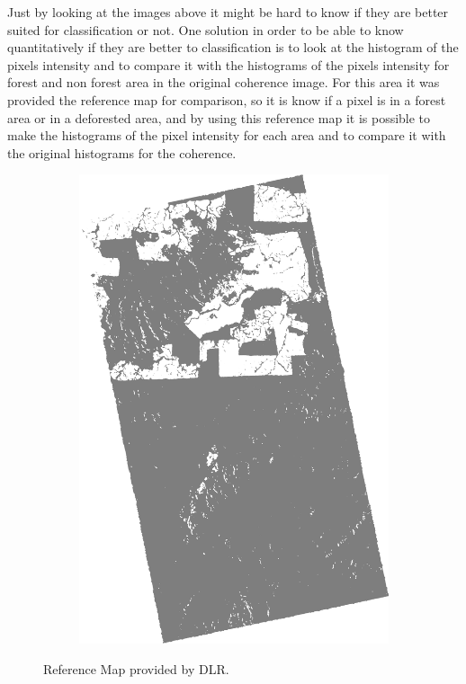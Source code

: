 Just by looking at the images above it might be hard to know if they are better suited for classification or not. One solution in order to be able to know quantitatively if they are better to classification is to look at the histogram of the pixels intensity and to compare it with the histograms of the pixels intensity for forest and non forest area in the original coherence image.
For this area it was provided the reference map for comparison, so it is know if a pixel is in a forest area or in a deforested area, and by using this reference map it is possible to make the histograms of the pixel intensity for each area and to compare it with the original histograms for the coherence.
\begin{figure}[H]
  \centering
  \begin{subfigure}[b]{0.4\linewidth}
    \includegraphics[width=\linewidth]{Chapter4/referencemap.png}
     
  \end{subfigure}
  \caption{Reference Map provided by DLR.}
  \label{fig:reference_map}
\end{figure}
